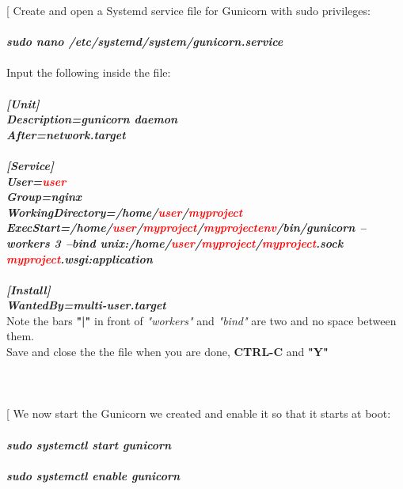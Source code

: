 \documentclass[a4paper]{article}
\makeatletter
\def\step{%
	\@ifnextchar[ \@myitem{\@noitemargtrue\@myitem[\@itemlabel]}}
\def\@myitem[#1]{\item[#1]\mbox{}\\}
\newenvironment{Step}{%
	\begin{enumerate}[label= \textbf {Step} \arabic*,align=left, leftmargin=1.0cm]%
	}{
\end{enumerate}%
}
\makeatother
\begin{document}
\begin{Step}
\step
Create and open a Systemd service file for Gunicorn with sudo privileges:\\ \\
\textbf{\emph{sudo nano /etc/systemd/system/gunicorn.service}}\\ \\
Input the following inside the file:\\\\
\textbf{\emph{[Unit]}}\\
\textbf{\emph{Description=gunicorn daemon}}\\
\textbf{\emph{After=network.target}}\\ \\
\textbf{\emph{[Service]}}\\
\textbf{\emph{User=\textcolor{red}{user}}}\\
\textbf{\emph{Group=nginx}}\\
\textbf{\emph{WorkingDirectory=/home/\textcolor{red}{user}/\textcolor{red}{myproject}}}\\
\textbf{\emph{ExecStart=/home/\textcolor{red}{user}/\textcolor{red}{myproject}/\textcolor{red}{myprojectenv}/bin/gunicorn --workers 3 --bind unix:/home/\textcolor{red}{user}/\textcolor{red}{myproject}/\textcolor{red}{myproject}.sock \textcolor{red}{myproject}.wsgi:application}}\\ \\
\textbf{\emph{[Install]}}\\
\textbf{\emph{WantedBy=multi-user.target}}\\

Note the bars \textbf{"|"} in front of \textit{"workers"} and \textit{"bind"} are two and no space between them.\\
Save and close the the file when you are done, \textbf{CTRL-C} and \textbf{"Y"}\\\\ \\ \\

\step
We now start the Gunicorn we created and enable it so that it starts at boot:\\ \\
\textbf{\emph{ sudo systemctl start gunicorn}}\\ \\
\textbf{\emph{ sudo systemctl enable gunicorn}}\\ \\







\end{Step}
	
	
	
	
	











	\newpage	
	
		
	\clearpage 
\end{document}

